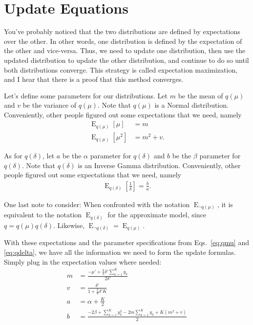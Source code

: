 \documentclass[12pt]{article}
\newcommand{\E}{\operatorname{E}}
\begin{document}
\section{Update Equations}

You've probably noticed that the two distributions are defined by expectations
over the other.  In other words, one distribution is defined by the expectation
of the other and vice-versa.  Thus, we need to update one distribution, then use
the updated distribution to update the other distribution, and continue to do so
until both distributions converge.  This strategy is called expectation
maximization, and I hear that there is a proof that this method converges.

Let's define some parameters for our distributions.  Let $m$ be the mean of
$q(\mu)$ and $v$ be the variance of $q(\mu)$.  Note that $q(\mu)$ is a Normal
distribution.  Conveniently, other people \autocite{gaussian} figured out some
expectations that we need, namely
\begin{align}
    \E_{q(\mu)}[\mu] &= m \\
    \E_{q(\mu)}[\mu^2] &= m^2 + v.
\end{align}

As for $q(\delta)$, let $a$ be the $\alpha$ parameter for $q(\delta)$ and $b$ be
the $\beta$ parameter for $q(\delta)$.  Note that $q(\delta)$ is an Inverse
Gamma distribution.  Conveniently, other people \autocite{invgamma} figured out
some expectations that we need, namely
\begin{align}
    \E_{q(\delta)}[\frac{1}{\delta}] = \frac{b}{a}.
\end{align}

One last note to consider:  When confronted with the notation
$\E_{\neg q(\mu)}$, it is equivalent to the notation $\E_{q(\delta)}$ for
the approximate model, since $q = q(\mu)q(\delta)$.  Likewise, $\E_{\neg
q(\delta)} = \E_{q(\mu)}$.

With these expectations and the parameter specifications from Eqs.~\ref{eq:qmu}
and \ref{eq:qdelta}, we have all the information we need to form the update
formulas.  Simply plug in the expectation values where needed:
\begin{align}
    m &= \frac{-\mu' + \frac{b}{a} \delta' \sum_{k=1}^{K}
    y_{k}}{2\delta'}
    \\
    v &= \frac{\delta'}{1 + \frac{b}{a}\delta'K}
    \\
    a &= \alpha + \frac{K}{2}
    \\
    b &= \frac{-2\beta + \sum_{k=1}^{K} y_{k}^{2} - 2m
    \sum_{k=1}^{K} y_{k} + K(m^2 + v)}{2}
\end{align}
\end{document}
